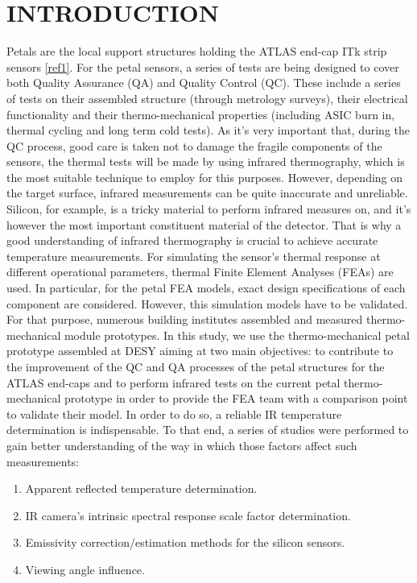 \pagestyle{introduction}

\section*{\uppercase{Introduction}}\label{intro}
	\bigskip
	\bigskip
	Petals are the local support structures holding the ATLAS end-cap ITk strip sensors \ref{ref1}. For the petal sensors, a series of tests are being designed to cover both Quality Assurance (QA) and Quality Control (QC). These include a series of tests on their assembled structure (through metrology surveys), their electrical functionality and their thermo-mechanical properties (including ASIC burn in, thermal cycling and long term cold tests). 
	As it’s very important that, during the QC process, good care is taken not to damage the fragile components of the sensors, the thermal tests will be made by using infrared thermography, which is the most suitable technique to employ for this purposes. However, depending on the target surface, infrared measurements can be quite inaccurate and unreliable. Silicon, for example, is a tricky material to perform infrared measures on, and it’s however the most important constituent material of the detector. That is why a good understanding of infrared thermography is crucial to achieve accurate temperature measurements.
	For simulating the sensor's thermal response at different operational parameters, thermal Finite Element Analyses (FEAs) are used. In particular, for the petal FEA models, exact design specifications of each component are considered. However, this simulation models have to be validated. For that purpose, numerous building institutes assembled and measured thermo-mechanical module prototypes.
	In this study, we use the thermo-mechanical petal prototype assembled at DESY aiming at two main objectives: to contribute to the improvement of the QC and QA processes of the petal structures for the ATLAS end-caps and to perform infrared tests on the current petal thermo-mechanical prototype in order to provide the FEA team with a comparison point to validate their model. In order to do so, a reliable IR temperature determination is indispensable. To that end, a series of studies were performed to gain better understanding of the way in which those factors affect such measurements:
		
	\begin{enumerate}
		\item Apparent reflected temperature determination.
		\item IR camera’s intrinsic spectral response scale factor determination.
		\item Emissivity correction/estimation methods for the silicon sensors.
		\item Viewing angle influence.
	\end{enumerate}
	
